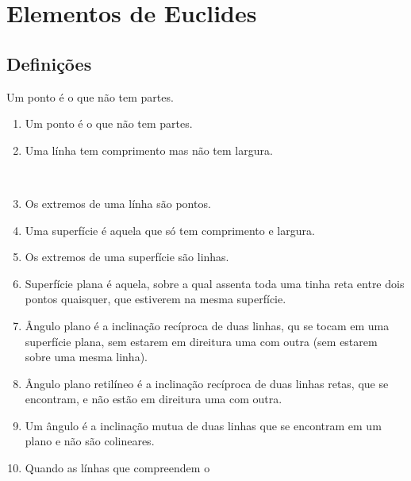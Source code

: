 \chapter{Elementos de Euclides}
\section{Definições}


\begin{defi}
Um ponto é o que não tem partes.
\end{defi}
\begin{enumerate}
 \item Um ponto é o que não tem partes.\\
 
 \item Uma línha tem comprimento mas não tem largura.\\
 \\
 \item Os extremos de uma línha são pontos.\\
 
 \item Uma superfície é aquela que só tem comprimento e largura.
 \item Os extremos de uma superfície são linhas.
 \item Superfície plana é aquela, sobre a qual assenta toda uma tinha reta entre dois pontos quaisquer, que estiverem na mesma superfície.
 \item Ângulo plano é a inclinação recíproca de duas linhas, qu se tocam em uma superfície plana, sem estarem em direitura uma com outra (sem estarem sobre uma mesma linha).
 \item Ângulo plano retilíneo é a inclinação recíproca de duas linhas retas, que se encontram, e não estão em direitura uma com outra.
 \item Um ângulo é a inclinação mutua de duas linhas que se encontram em um plano e não são colineares.
 \item Quando as línhas que compreendem o 

\end{enumerate}
